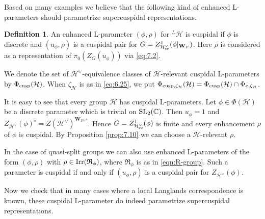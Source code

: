 \documentclass[11pt]{amsart}
\theoremstyle{definition}
\newtheorem{defn}[thm]{Definition}
\newcommand{\mb}{\mathbf}
\newcommand{\C}{\mathbb C}
\def\Irr{{\rm Irr}}
\def\SL{{\rm SL}}
\def\cH{{\mathcal H}}
\def\cR{{\mathfrak R}}
\def\sc{{\rm sc}}
\def\cusp{{\rm cusp}}
\begin{document}
Based on many examples we believe that the following kind of enhanced L-parameters 
should parametrize supercuspidal representations.

\begin{defn}\label{def:7.1}
An enhanced L-parameter $(\phi,\rho)$ for ${}^L \cH$ is cuspidal if $\phi$ is
discrete and $(u_\phi,\rho)$ is a cuspidal pair for $G = Z^1_{\cH^\vee_{\sc}}(\phi 
|_{\mb W_F})$. Here $\rho$ is considered as a representation of $\pi_0 (Z_G (u_\phi))$
via \eqref{eq:7.2}.

We denote the set of $\cH^\vee$-equivalence classes of $\cH$-relevant cuspidal
L-parameters by $\Phi_\cusp (\cH)$. When $\zeta_\cH$ is as in \eqref{eq:6.25}, we
put $\Phi_{\cusp,\zeta_\cH} (\cH) = \Phi_\cusp (\cH) \cap \Phi_{e,\zeta_\cH}$.
\end{defn}

It is easy to see that every group $\cH$ has cuspidal L-parameters. 
Let $\phi \in \Phi (\cH)$ be a discrete parameter which is trivial on $\SL_2 (\C)$. 
Then $u_\phi = 1$ and $Z_{\cH^\vee}(\phi)^\circ = Z(\cH^\vee)^{\mb W_F,\circ}$. Hence  
$G = Z^1_{\cH^\vee_\sc}(\phi)$ is finite and every enhancement $\rho$ of $\phi$ is 
cuspidal. By Proposition \ref{prop:7.10} we can choose a $\cH$-relevant $\rho$.

In the case of quasi-split groups we can also use enhanced L-parameters of the form
$(\phi,\rho)$ with $\rho \in \Irr (\cR_\phi)$, where $\cR_\phi$ is as in 
\eqref{eqn:R-group}. Such a parameter is cuspidal if and only if $(u_\phi,\rho)$ is
a cuspidal pair for $Z_{\cH^\vee}(\phi)$.

Now we check that in many cases where a local Langlands correspondence is known,
these cuspidal L-parameter do indeed parametrize supercuspidal representations.
 
\end{document}
